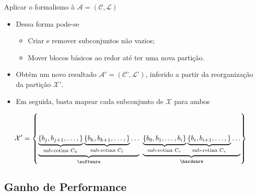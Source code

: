    
   \begin{frame}{Aplicar o formalismo à $\mathcal{A} = (\mathcal{C}, \mathcal{L})$}
      \begin{itemize}
         
         \item Dessa forma pode-se
            \begin{itemize}
               \item Criar e remover subconjuntos não vazios;
               \item Mover blocos básicos ao redor até ter uma nova partição.
            \end{itemize}                     
         
         \item Obtém um novo resultado $ \mathcal{A}’ = (\mathcal{C}’, \mathcal{L}’) $, inferido a partir da reorganização da partição $ \mathcal{X}’ $.

            \bigskip         
         
         \item Em seguida, basta mapear cada subconjunto de $ \mathcal{X} $ para ambos \hs
      
      \end{itemize}
         { \footnotesize
         \begin{equation}
            \mathcal{X}'   = \left \{
            \underbrace{
               \underbrace{
                  \left \{ b_j, b_{j+1}, \dots, \right \}
               }_{\text{sub-rotina }C_k}
               \underbrace{
                  \left \{ b_k, b_{k+1}, \dots, \right \}
               }_{\text{sub-rotina }C_l}
               \dots
            }_{\text{\software}}
            \
            \underbrace{
               \underbrace{
                  \left \{ b_0, b_1, \dots, b_i \right \}
               }_{\text{sub-rotina }C_r}
               \underbrace{
                  \left \{ b_i, b_{i+1}, \dots, \right \}
               }_{\text{sub-rotina }C_s}
               \dots
            }_{\text{\hardware}}
            \right \} \label{eq:part_final}
         \end{equation}
         }
   \end{frame}
   
   
   \subsection{Ganho de Performance}
   
